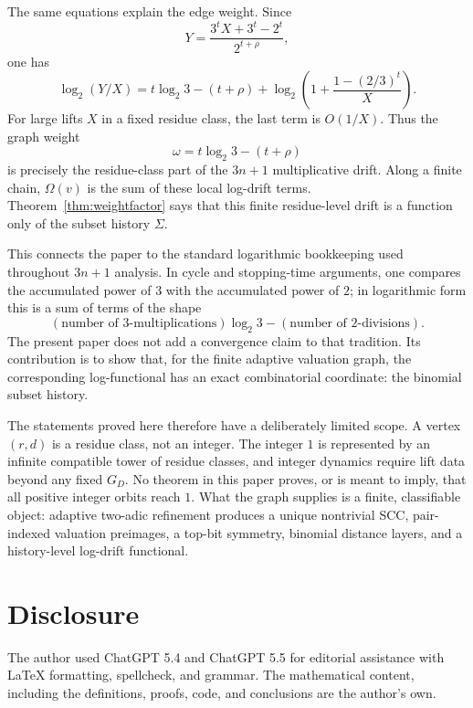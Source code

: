 \documentclass[11pt]{amsart}
\theoremstyle{definition}
\theoremstyle{remark}
\begin{document}
The same equations explain the edge weight.  Since
\[
Y=\frac{3^tX+3^t-2^t}{2^{t+\rho}},
\]
one has
\[
\log_2(Y/X)
=
t\log_2 3-(t+\rho)
+
\log_2\!\left(1+\frac{1-(2/3)^t}{X}\right).
\]
For large lifts $X$ in a fixed residue class, the last term is $O(1/X)$.  Thus the graph weight
\[
\omega=t\log_2 3-(t+\rho)
\]
is precisely the residue-class part of the $3n+1$ multiplicative drift.  Along a finite chain, $\Omega(v)$ is the sum of these local log-drift terms.  Theorem~\ref{thm:weightfactor} says that this finite residue-level drift is a function only of the subset history $\Sigma$.

This connects the paper to the standard logarithmic bookkeeping used throughout $3n+1$ analysis.  In cycle and stopping-time arguments, one compares the accumulated power of $3$ with the accumulated power of $2$; in logarithmic form this is a sum of terms of the shape
\[
(\text{number of }3\text{-multiplications})\log_2 3
-
(\text{number of }2\text{-divisions}).
\]
The present paper does not add a convergence claim to that tradition.  Its contribution is to show that, for the finite adaptive valuation graph, the corresponding log-functional has an exact combinatorial coordinate: the binomial subset history.

The statements proved here therefore have a deliberately limited scope.  A vertex $(r,d)$ is a residue class, not an integer.  The integer $1$ is represented by an infinite compatible tower of residue classes, and integer dynamics require lift data beyond any fixed $G_D$.  No theorem in this paper proves, or is meant to imply, that all positive integer orbits reach $1$.  What the graph supplies is a finite, classifiable object: adaptive two-adic refinement produces a unique nontrivial SCC, pair-indexed valuation preimages, a top-bit symmetry, binomial distance layers, and a history-level log-drift functional.

\section*{Disclosure}\label{sec:disclosure}
The author used ChatGPT 5.4 and ChatGPT 5.5 for editorial assistance with LaTeX formatting, spellcheck, and grammar. The mathematical content, including the definitions, proofs, code, and conclusions are the author's own.
\end{document}

